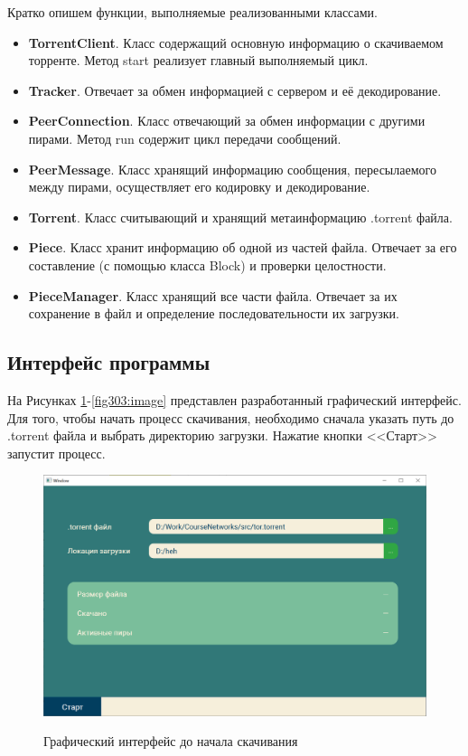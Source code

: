 Кратко опишем функции, выполняемые реализованными классами.
\begin{itemize}
	\item \textbf{TorrentClient}. Класс содержащий основную информацию о скачиваемом торренте. Метод start реализует главный выполняемый цикл.
	\item \textbf{Tracker}. Отвечает за обмен информацией с сервером и её декодирование.
	\item \textbf{PeerConnection}. Класс отвечающий за обмен информации с другими пирами. Метод run содержит цикл передачи сообщений. 
	\item \textbf{PeerMessage}. Класс хранящий информацию сообщения, пересылаемого между пирами, осуществляет его кодировку и декодирование.
	\item \textbf{Torrent}. Класс считывающий и хранящий метаинформацию .torrent файла.
	\item \textbf{Piece}. Класс хранит информацию об одной из частей файла. Отвечает за его составление (с помощью класса Block) и проверки целостности.
	\item \textbf{PieceManager}. Класс хранящий все части файла. Отвечает за их сохранение в файл и определение последовательности их загрузки.
\end{itemize}

\newpage

\subsection{Интерфейс программы}
На Рисунках \ref{fig302:image}-\ref{fig303:image} представлен разработанный графический интерфейс. Для того, чтобы начать процесс скачивания, необходимо сначала указать путь до .torrent файла и выбрать директорию загрузки. Нажатие кнопки <<Старт>> запустит процесс.
\begin{figure}[h]
	\begin{center}
		{\includegraphics[scale = 0.57]{img/interface_before.png}}
		\caption{Графический интерфейс до начала скачивания}
		\label{fig302:image}
	\end{center}
\end{figure}

